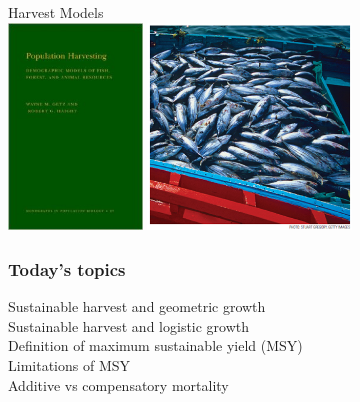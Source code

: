 \documentclass[color=usenames,dvipsnames]{beamer}\usepackage[]{graphicx}\usepackage[]{color}
\begin{document}
\begin{frame}[plain]
  \begin{center}
    {\huge Harvest Models} \\
    \vfill
    \includegraphics[height=5.5cm,keepaspectratio]{figs/book} \hspace{0.3cm}
    \includegraphics[height=5.5cm,keepaspectratio]{figs/tuna}
  \end{center}
\end{frame}



\begin{frame}
  \frametitle{Today's topics}
  \large
  Sustainable harvest and geometric growth \\
  \vfill
  Sustainable harvest and logistic growth \\
  \vfill
  Definition of maximum sustainable yield (MSY) \\
  \vfill
  Limitations of MSY \\
  \vfill
  Additive vs compensatory mortality
\end{frame}
\end{document}
